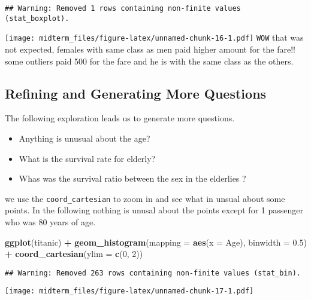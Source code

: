 \documentclass[]{article}
\newenvironment{Shaded}{\begin{snugshade}}{\end{snugshade}}
\newcommand{\DataTypeTok}[1]{\textcolor[rgb]{0.13,0.29,0.53}{#1}}
\newcommand{\DecValTok}[1]{\textcolor[rgb]{0.00,0.00,0.81}{#1}}
\newcommand{\FloatTok}[1]{\textcolor[rgb]{0.00,0.00,0.81}{#1}}
\newcommand{\KeywordTok}[1]{\textcolor[rgb]{0.13,0.29,0.53}{\textbf{#1}}}
\newcommand{\NormalTok}[1]{#1}
\newcommand{\OperatorTok}[1]{\textcolor[rgb]{0.81,0.36,0.00}{\textbf{#1}}}
\newcommand{\StringTok}[1]{\textcolor[rgb]{0.31,0.60,0.02}{#1}}
\providecommand{\tightlist}{%
  \setlength{\itemsep}{0pt}\setlength{\parskip}{0pt}}
\begin{document}
\begin{verbatim}
## Warning: Removed 1 rows containing non-finite values (stat_boxplot).
\end{verbatim}

\texttt{[image: midterm\_files/figure-latex/unnamed-chunk-16-1.pdf]}
\texttt{WOW} that was not expected, females with same class as men paid
higher amount for the fare!! some outliers paid 500 for the fare and he
is with the same class as the others.

\hypertarget{refining-and-generating-more-questions}{%
\subsection{Refining and Generating More
Questions}\label{refining-and-generating-more-questions}}

The following exploration leads us to generate more questions.

\begin{itemize}
\tightlist
\item
  Anything is unusual about the age?
\item
  What is the survival rate for elderly?
\item
  Whas was the survival ratio between the sex in the elderlies ?
\end{itemize}

we use the \texttt{coord\_cartesian} to zoom in and see what in unsual
about some points. In the following nothing is unusal about the points
except for 1 passenger who was 80 years of age.

\begin{Shaded}
\begin{Highlighting}[]
\KeywordTok{ggplot}\NormalTok{(titanic) }\OperatorTok{+}\StringTok{ }
\StringTok{  }\KeywordTok{geom_histogram}\NormalTok{(}\DataTypeTok{mapping =} \KeywordTok{aes}\NormalTok{(}\DataTypeTok{x =}\NormalTok{ Age), }\DataTypeTok{binwidth =} \FloatTok{0.5}\NormalTok{) }\OperatorTok{+}
\StringTok{  }\KeywordTok{coord_cartesian}\NormalTok{(}\DataTypeTok{ylim =} \KeywordTok{c}\NormalTok{(}\DecValTok{0}\NormalTok{, }\DecValTok{2}\NormalTok{))}
\end{Highlighting}
\end{Shaded}

\begin{verbatim}
## Warning: Removed 263 rows containing non-finite values (stat_bin).
\end{verbatim}

\texttt{[image: midterm\_files/figure-latex/unnamed-chunk-17-1.pdf]}
\end{document}
